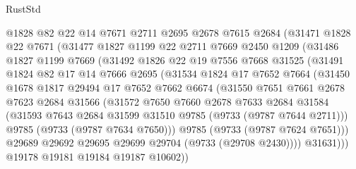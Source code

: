 \begin{lexlean}{RustStd}
\begin{coremodule}
              @1828
              @82
              @22
              @14
              @7671
              @2711
              @2695
              @2678
              @7615
              @2684
              (@31471
                @1828
                @22
                @7671
                (@31477
                  @1827
                  @1199
                  @22
                  @2711
                  @7669
                  @2450
                  @1209
                  (@31486
                    @1827
                    @1199
                    @7669
                    (@31492
                      @1826
                      @22
                      @19
                      @7556
                      @7668
                      @31525
                      (@31491
                        @1824
                        @82
                        @17
                        @14
                        @7666
                        @2695
                        (@31534
                          @1824
                          @17
                          @7652
                          @7664
                          (@31450
                            @1678
                            @1817
                            @29494
                            @17
                            @7652
                            @7662
                            @6674
                            (@31550
                              @7651
                              @7661
                              @2678
                              @7623
                              @2684
                              @31566
                              (@31572
                                @7650
                                @7660
                                @2678
                                @7633
                                @2684
                                @31584
                                (@31593 @7643 @2684 @31599 @31510 @9785 (@9733 (@9787 @7644 @2711)))
                                @9785
                                (@9733 (@9787 @7634 @7650)))
                              @9785
                              (@9733 (@9787 @7624 @7651)))
                            @29689
                            @29692
                            @29695
                            @29699
                            @29704
                            (@9733 (@29708 @2430))))
                        @31631)))
                  @19178
                  @19181
                  @19184
                  @19187
                  @10602))

\end{coremodule}
\end{lexlean}
